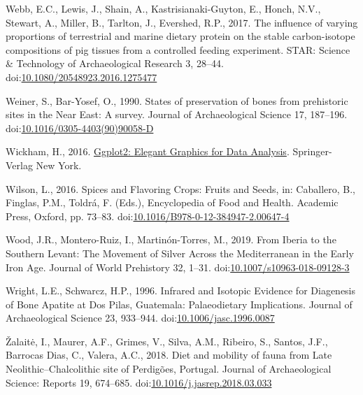 \documentclass[review]{elsarticle} %
\newlength{\cslhangindent}
\newenvironment{CSLReferences}[2] %
 {%
  \setlength{\parindent}{0pt}
  \ifodd #1 \everypar{\setlength{\hangindent}{\cslhangindent}}\ignorespaces\fi
  \ifnum #2 > 0
  \setlength{\parskip}{#2\baselineskip}
  \fi
 }%
 {}
\begin{document}
\begin{CSLReferences}{1}{0}
\leavevmode{}%
Webb, E.C., Lewis, J., Shain, A., Kastrisianaki-Guyton, E., Honch, N.V., Stewart, A., Miller, B., Tarlton, J., Evershed, R.P., 2017. The influence of varying proportions of terrestrial and marine dietary protein on the stable carbon-isotope compositions of pig tissues from a controlled feeding experiment. STAR: Science \& Technology of Archaeological Research 3, 28--44. doi:\href{https://doi.org/10.1080/20548923.2016.1275477}{10.1080/20548923.2016.1275477}

\leavevmode{}%
Weiner, S., Bar-Yosef, O., 1990. States of preservation of bones from prehistoric sites in the {Near East}: {A} survey. Journal of Archaeological Science 17, 187--196. doi:\href{https://doi.org/10.1016/0305-4403(90)90058-D}{10.1016/0305-4403(90)90058-D}

\leavevmode{}%
Wickham, H., 2016. \href{https://ggplot2.tidyverse.org}{Ggplot2: {Elegant Graphics} for {Data Analysis}}. {Springer-Verlag New York}.

\leavevmode{}%
Wilson, L., 2016. Spices and {Flavoring Crops}: {Fruits} and {Seeds}, in: Caballero, B., Finglas, P.M., Toldrá, F. (Eds.), Encyclopedia of {Food} and {Health}. {Academic Press}, {Oxford}, pp. 73--83. doi:\href{https://doi.org/10.1016/B978-0-12-384947-2.00647-4}{10.1016/B978-0-12-384947-2.00647-4}

\leavevmode{}%
Wood, J.R., Montero-Ruiz, I., Martinón-Torres, M., 2019. From {Iberia} to the {Southern Levant}: {The Movement} of {Silver Across} the {Mediterranean} in the {Early Iron Age}. Journal of World Prehistory 32, 1--31. doi:\href{https://doi.org/10.1007/s10963-018-09128-3}{10.1007/s10963-018-09128-3}

\leavevmode{}%
Wright, L.E., Schwarcz, H.P., 1996. Infrared and {Isotopic Evidence} for {Diagenesis} of {Bone Apatite} at {Dos Pilas}, {Guatemala}: {Palaeodietary Implications}. Journal of Archaeological Science 23, 933--944. doi:\href{https://doi.org/10.1006/jasc.1996.0087}{10.1006/jasc.1996.0087}

\leavevmode{}%
Žalaitė, I., Maurer, A.F., Grimes, V., Silva, A.M., Ribeiro, S., Santos, J.F., Barrocas Dias, C., Valera, A.C., 2018. Diet and mobility of fauna from {Late Neolithic}--{Chalcolithic} site of {Perdigões}, {Portugal}. Journal of Archaeological Science: Reports 19, 674--685. doi:\href{https://doi.org/10.1016/j.jasrep.2018.03.033}{10.1016/j.jasrep.2018.03.033}

\end{CSLReferences}
\end{document}
